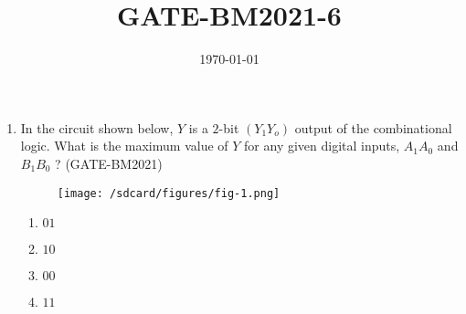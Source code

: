 \documentclass[12pt]{article}
\begin{document}
\title{GATE-BM2021-6}
\author{}
\date{\today}
\maketitle
\begin{enumerate}
\item In the circuit shown below, $Y$ is a $2$-bit $(Y_1Y_o)$ output of the combinational logic. What is the 
maximum value of $Y$ for any given digital inputs, $A_1A_0$ and $B_1B_0$ ?
		\hfill(GATE-BM2021)
\begin{figure}[H]
\centering
\texttt{[image: /sdcard/figures/fig-1.png]}
\caption{}
\label{fig:fig-1.png}
\end{figure}
\begin{enumerate}[label=(\Alph*)]
\item $01$
\item $10$
\item $00$
\item $11$
\end{enumerate}
\end{enumerate}
\end{document}
